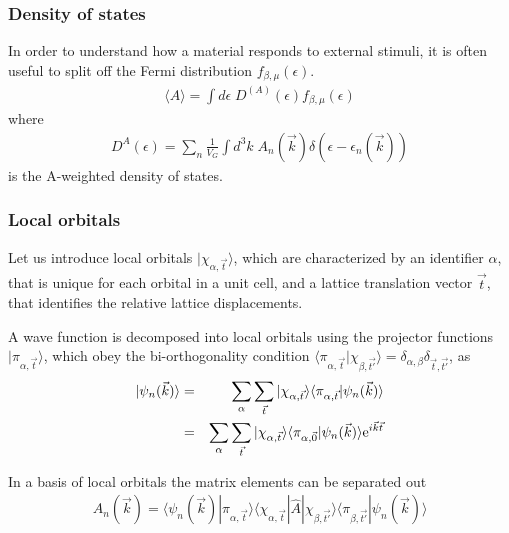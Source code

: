 \documentclass[11pt,a4paper]{report}
\begin{document}
\subsubsection{Density of states}
In order to understand how a material responds to external stimuli, it
is often useful to split off the Fermi distribution
$f_{\beta,\mu}(\epsilon)$.
\begin{eqnarray}
\langle{A}\rangle=\int d\epsilon\; D^{(A)}(\epsilon)
f_{\beta,\mu}(\epsilon)
\end{eqnarray}
where
\begin{eqnarray}
D^{A}(\epsilon)=
\sum_n\frac{1}{V_G}\int d^3k\; A_{n}(\vec{k})\delta(\epsilon-\epsilon_n(\vec{k}))
\end{eqnarray}
is the A-weighted density of states.

\subsubsection{Local orbitals}
Let us introduce local orbitals $|\chi_{\alpha,\vec{t}}\rangle$, which
are characterized by an identifier $\alpha$, that is unique for each
orbital in a unit cell, and a lattice translation vector $\vec{t}$,
that identifies the relative lattice displacements.

A wave function is decomposed into local orbitals using the projector
functions $|\pi_{\alpha,\vec{t}}\rangle$, which obey the
bi-orthogonality condition
$\langle\pi_{\alpha,\vec{t}}|\chi_{\beta,\vec{t'}}\rangle=\delta_{\alpha,\beta}
\delta_{\vec{t},\vec{t'}}$, as
\begin{eqnarray}
|\psi_n(\vec{k})\rangle
&=&\sum_{\alpha}\sum_{\vec{t}}
|\chi_{\alpha,\vec{t}}\rangle
\langle\pi_{\alpha,\vec{t}}|\psi_n(\vec{k})\rangle
\nonumber\\
&=&\sum_{\alpha}\sum_{\vec{t}}
|\chi_{\alpha,\vec{t}}\rangle
\langle\pi_{\alpha,\vec{0}}|\psi_n(\vec{k})\rangle\mathrm{e}^{i\vec{k}\vec{t}}
\end{eqnarray}

In a basis of local orbitals the matrix elements can be separated out
\begin{eqnarray}
A_{n}(\vec{k})=\langle\psi_n(\vec{k})|\pi_{\alpha,\vec{t}}\rangle
\langle\chi_{\alpha,\vec{t}}|\hat{A}|\chi_{\beta,\vec{t'}}\rangle
\langle\pi_{\beta,\vec{t'}}|\psi_n(\vec{k})\rangle
\end{eqnarray}
\end{document}
